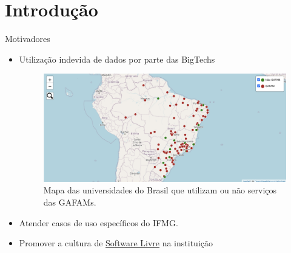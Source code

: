 \AtBeginSection[]{
	\begin{frame}
		\frametitle{}
		\tableofcontents[currentsection]
	\end{frame}
}

\section{Introdução}
\begin{frame}{Motivadores}
	\begin{itemize}[<+->]
		\item Utilização indevida de dados por parte das BigTechs
		\begin{minipage}{\linewidth}
			\begin{figure}
				\centering
				\includegraphics[width=\textwidth]{images/gafam-map.png}
				\caption{Mapa das universidades do Brasil que utilizam ou não serviços das GAFAMs.}
			\end{figure}
		\end{minipage}
		\item Atender casos de uso específicos do IFMG.
		\item Promover a cultura de \href{https://www.gnu.org/philosophy/free-sw.pt-br.html}{Software Livre} na instituição
	\end{itemize}
\end{frame}